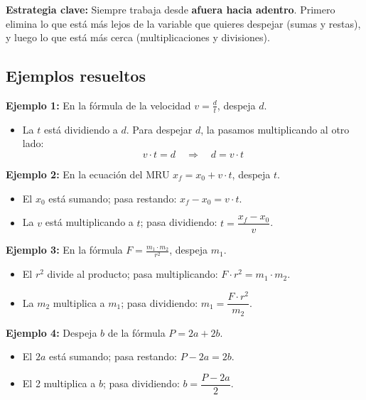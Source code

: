 \documentclass[12pt, a4paper]{article}
\begin{document}
\begin{cuadroadvertencia}
\textbf{Estrategia clave:} Siempre trabaja desde \textbf{afuera hacia adentro}. Primero elimina lo que está más lejos de la variable que quieres despejar (sumas y restas), y luego lo que está más cerca (multiplicaciones y divisiones).
\end{cuadroadvertencia}

\subsection{Ejemplos resueltos}

\noindent\textbf{Ejemplo 1:} En la fórmula de la velocidad $v = \frac{d}{t}$, despeja $d$.
\begin{itemize}
  \item La $t$ está dividiendo a $d$. Para despejar $d$, la pasamos multiplicando al otro lado:
  $$v \cdot t = d \quad \Longrightarrow \quad d = v \cdot t$$
\end{itemize}

\noindent\textbf{Ejemplo 2:} En la ecuación del MRU $x_f = x_0 + v \cdot t$, despeja $t$.
\begin{itemize}
  \item El $x_0$ está sumando; pasa restando: $x_f - x_0 = v \cdot t$.
  \item La $v$ está multiplicando a $t$; pasa dividiendo: $t = \dfrac{x_f - x_0}{v}$.
\end{itemize}

\noindent\textbf{Ejemplo 3:} En la fórmula $F = \frac{m_1 \cdot m_2}{r^2}$, despeja $m_1$.
\begin{itemize}
  \item El $r^2$ divide al producto; pasa multiplicando: $F \cdot r^2 = m_1 \cdot m_2$.
  \item La $m_2$ multiplica a $m_1$; pasa dividiendo: $m_1 = \dfrac{F \cdot r^2}{m_2}$.
\end{itemize}

\noindent\textbf{Ejemplo 4:} Despeja $b$ de la fórmula $P = 2a + 2b$.
\begin{itemize}
  \item El $2a$ está sumando; pasa restando: $P - 2a = 2b$.
  \item El 2 multiplica a $b$; pasa dividiendo: $b = \dfrac{P - 2a}{2}$.
\end{itemize}

\newpage

\end{document}
